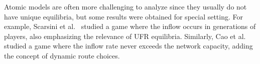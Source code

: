 Atomic models are often more challenging to analyze since they usually do not have unique equilibria, but some results were obtained for special setting. For example, Scarsini et al.~\cite{DBLP:journals/ior/ScarsiniST18} studied a game where the inflow occurs in generations of players, also emphasizing the relevance of UFR equilibria. Similarly, Cao et al.~\cite{DBLP:conf/sigecom/CaoCCW17} studied a game where the inflow rate never exceeds the network capacity, adding the concept of dynamic route choices.



